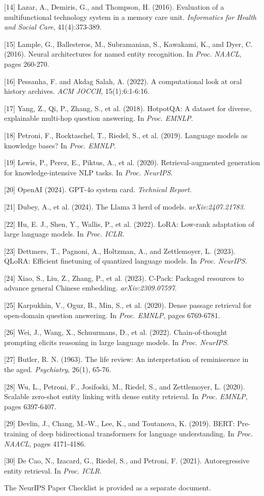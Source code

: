 \documentclass[
]{article}
\begin{document}
{[}14{]} Lazar, A., Demiris, G., and Thompson, H. (2016). Evaluation of
a multifunctional technology system in a memory care unit.
\emph{Informatics for Health and Social Care}, 41(4):373-389.

{[}15{]} Lample, G., Ballesteros, M., Subramanian, S., Kawakami, K., and
Dyer, C. (2016). Neural architectures for named entity recognition. In
\emph{Proc. NAACL}, pages 260-270.

{[}16{]} Pessanha, F. and Akdag Salah, A. (2022). A computational look
at oral history archives. \emph{ACM JOCCH}, 15(1):6:1-6:16.

{[}17{]} Yang, Z., Qi, P., Zhang, S., et al. (2018). HotpotQA: A dataset
for diverse, explainable multi-hop question answering. In \emph{Proc.
EMNLP}.

{[}18{]} Petroni, F., Rocktaschel, T., Riedel, S., et al. (2019).
Language models as knowledge bases? In \emph{Proc. EMNLP}.

{[}19{]} Lewis, P., Perez, E., Piktus, A., et al. (2020).
Retrieval-augmented generation for knowledge-intensive NLP tasks. In
\emph{Proc. NeurIPS}.

{[}20{]} OpenAI (2024). GPT-4o system card. \emph{Technical Report}.

{[}21{]} Dubey, A., et al. (2024). The Llama 3 herd of models.
\emph{arXiv:2407.21783}.

{[}22{]} Hu, E. J., Shen, Y., Wallis, P., et al. (2022). LoRA: Low-rank
adaptation of large language models. In \emph{Proc. ICLR}.

{[}23{]} Dettmers, T., Pagnoni, A., Holtzman, A., and Zettlemoyer, L.
(2023). QLoRA: Efficient finetuning of quantized language models. In
\emph{Proc. NeurIPS}.

{[}24{]} Xiao, S., Liu, Z., Zhang, P., et al. (2023). C-Pack: Packaged
resources to advance general Chinese embedding. \emph{arXiv:2309.07597}.

{[}25{]} Karpukhin, V., Oguz, B., Min, S., et al. (2020). Dense passage
retrieval for open-domain question answering. In \emph{Proc. EMNLP},
pages 6769-6781.

{[}26{]} Wei, J., Wang, X., Schuurmans, D., et al. (2022).
Chain-of-thought prompting elicits reasoning in large language models.
In \emph{Proc. NeurIPS}.

{[}27{]} Butler, R. N. (1963). The life review: An interpretation of
reminiscence in the aged. \emph{Psychiatry}, 26(1), 65-76.

{[}28{]} Wu, L., Petroni, F., Josifoski, M., Riedel, S., and
Zettlemoyer, L. (2020). Scalable zero-shot entity linking with dense
entity retrieval. In \emph{Proc. EMNLP}, pages 6397-6407.

{[}29{]} Devlin, J., Chang, M.-W., Lee, K., and Toutanova, K. (2019).
BERT: Pre-training of deep bidirectional transformers for language
understanding. In \emph{Proc. NAACL}, pages 4171-4186.

{[}30{]} De Cao, N., Izacard, G., Riedel, S., and Petroni, F. (2021).
Autoregressive entity retrieval. In \emph{Proc. ICLR}.

The NeurIPS Paper Checklist is provided as a separate document.
\end{document}
